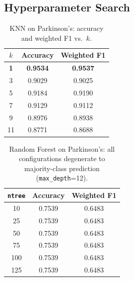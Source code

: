 \documentclass[11pt,letterpaper]{article}
\begin{document}
\subsection{Hyperparameter Search}

\begin{table}[H]
\centering
\caption{KNN on Parkinson's: accuracy and weighted F1 vs.\ $k$.}
\label{tab:d2_knn}
\begin{tabular}{@{}ccc@{}}
\toprule
$k$ & Accuracy & Weighted F1 \\
\midrule
\rowcolor{hilight}
\textbf{1}  & \textbf{0.9534} & \textbf{0.9537} \\
3  & 0.9029 & 0.9025 \\
5  & 0.9184 & 0.9190 \\
7  & 0.9129 & 0.9112 \\
9  & 0.8976 & 0.8938 \\
11 & 0.8771 & 0.8688 \\
\bottomrule
\end{tabular}
\end{table}

\begin{table}[H]
\centering
\caption{Random Forest on Parkinson's: all configurations degenerate to
         majority-class prediction (\texttt{max\_depth}=12).}
\label{tab:d2_rf}
\begin{tabular}{@{}ccc@{}}
\toprule
\texttt{ntree} & Accuracy & Weighted F1 \\
\midrule
10  & 0.7539 & 0.6483 \\
25  & 0.7539 & 0.6483 \\
50  & 0.7539 & 0.6483 \\
75  & 0.7539 & 0.6483 \\
100 & 0.7539 & 0.6483 \\
125 & 0.7539 & 0.6483 \\
\bottomrule
\end{tabular}
\end{table}
\end{document}
